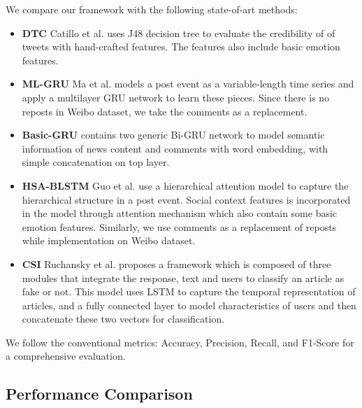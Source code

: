 \documentclass[conference]{IEEEtran}
\newcommand{\m}{EFND}
\begin{document}
	We compare our framework with the following state-of-art methods:
	\begin{itemize}
		\item \textbf{DTC} Catillo et al.\cite{castillo2011information} uses J48 decision tree to evaluate the credibility of of tweets with hand-crafted features. The features also include basic emotion features. 
		\item \textbf{ML-GRU} Ma et al.\cite{ma2016detecting} models a post event as a variable-length time series and apply a multilayer GRU network to learn these pieces. Since there is no reposts in Weibo dataset, we take the comments as a replacement.
		\item \textbf{Basic-GRU} contains two generic Bi-GRU network to model semantic information of news content and comments with word embedding, with simple concatenation on top layer.
		\item \textbf{HSA-BLSTM} Guo et al.\cite{guo2018rumor} use a hierarchical attention model to capture the hierarchical structure in a post event. Social context features is incorporated in the model through attention mechanism which also contain some basic emotion features. Similarly, we use comments as a replacement of reposts while implementation on Weibo dataset.
		\item \textbf{CSI} Ruchansky et al.\cite{ruchansky2017csi} proposes a framework which is composed of three modules that integrate the response, text and users to classify an article as fake or not. This model uses LSTM to capture the temporal representation of articles, and a fully connected layer to model characteristics of users and then concatenate these two vectors for classification.
	\end{itemize} 
	We follow the conventional metrics:  Accuracy, Precision, Recall, and F1-Score for a comprehensive evaluation.
	
	\subsection{Performance Comparison}
	
\end{document}
